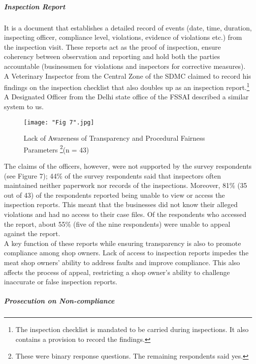 \documentclass[a4paper, 12pt]{article}
\begin{document}
\subparagraph{Inspection Report}

It is a document that establishes a detailed record of events (date, time, duration, inspecting officer, compliance level, violations, evidence of violations etc.) from the inspection visit. These reports act as the proof of inspection, ensure coherency between observation and reporting and hold both the parties accountable (businessmen for violations and inspectors for corrective measures). \\

A Veterinary Inspector from the Central Zone of the SDMC claimed to record his findings on the inspection checklist that also doubles up as an inspection report.\footnote{The inspection checklist is mandated to be carried during inspections. It also contains a provision to record the findings.} A Designated Officer from the Delhi state office of the FSSAI described a similar system to us.\\

\begin{figure}[H]
\centering
\texttt{[image: "Fig 7".jpg]}
\caption[Optional Caption]{Lack of Awareness of Transparency and Procedural Fairness Parameters \footnote{ These were binary response questions. The remaining respondents said yes.}(n = 43)}
\end{figure} 

The claims of the officers, however, were not supported by the survey respondents (see Figure 7); 44\% of the survey respondents said that inspectors often maintained neither paperwork nor records of the inspections. Moreover, 81\% (35 out of 43) of the respondents reported being unable to view or access the inspection reports. This meant that the businesses did not know their alleged violations and had no access to their case files. Of the respondents who accessed the report, about 55\% (five of the nine respondents) were unable to appeal against the report. \\

A key function of these reports while ensuring transparency is also to promote compliance among shop owners. Lack of access to inspection reports impedes the meat shop owners’ ability to address faults and improve compliance. This also affects the process of appeal, restricting a shop owner’s ability to challenge inaccurate or false inspection reports.\\

\subparagraph{Prosecution on Non-compliance}
\end{document}
